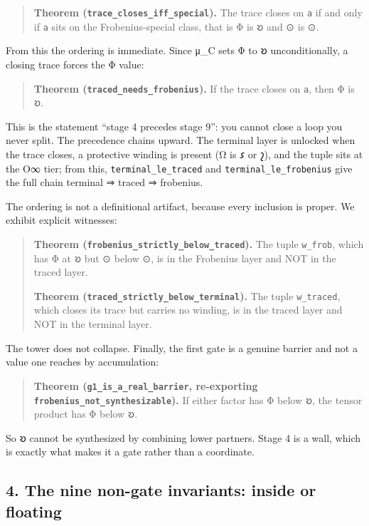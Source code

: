 \documentclass[12pt,a4paper]{article}
\begin{document}
\begin{quote}
\textbf{Theorem (\texttt{trace\_closes\_iff\_special}).} The trace
closes on \texttt{a} if and only if \texttt{a} sits on the
Frobenius-special class, that is Φ is 𐑹 and ⊙ is ⊙.
\end{quote}

From this the ordering is immediate. Since μ\_C sets Φ to 𐑹
unconditionally, a closing trace forces the Φ value:

\begin{quote}
\textbf{Theorem (\texttt{traced\_needs\_frobenius}).} If the trace
closes on \texttt{a}, then Φ is 𐑹.
\end{quote}

This is the statement ``stage 4 precedes stage 9'': you cannot close a
loop you never split. The precedence chains upward. The terminal layer
is unlocked when the trace closes, a protective winding is present (Ω is
𐑭 or 𐑟), and the tuple sits at the O∞ tier; from this,
\texttt{terminal\_le\_traced} and \texttt{terminal\_le\_frobenius} give
the full chain terminal ⇒ traced ⇒ frobenius.

The ordering is not a definitional artifact, because every inclusion is
proper. We exhibit explicit witnesses:

\begin{quote}
\textbf{Theorem (\texttt{frobenius\_strictly\_below\_traced}).} The
tuple \texttt{w\_frob}, which has Φ at 𐑹 but ⊙ below ⊙, is in the
Frobenius layer and NOT in the traced layer.

\textbf{Theorem (\texttt{traced\_strictly\_below\_terminal}).} The tuple
\texttt{w\_traced}, which closes its trace but carries no winding, is in
the traced layer and NOT in the terminal layer.
\end{quote}

The tower does not collapse. Finally, the first gate is a genuine
barrier and not a value one reaches by accumulation:

\begin{quote}
\textbf{Theorem (\texttt{g1\_is\_a\_real\_barrier}, re-exporting
\texttt{frobenius\_not\_synthesizable}).} If either factor has Φ below
𐑹, the tensor product has Φ below 𐑹.
\end{quote}

So 𐑹 cannot be synthesized by combining lower partners. Stage 4 is a
wall, which is exactly what makes it a gate rather than a coordinate.

\hypertarget{the-nine-non-gate-invariants-inside-or-floating}{%
\subsection{4. The nine non-gate invariants: inside or
floating}\label{the-nine-non-gate-invariants-inside-or-floating}}
\end{document}
